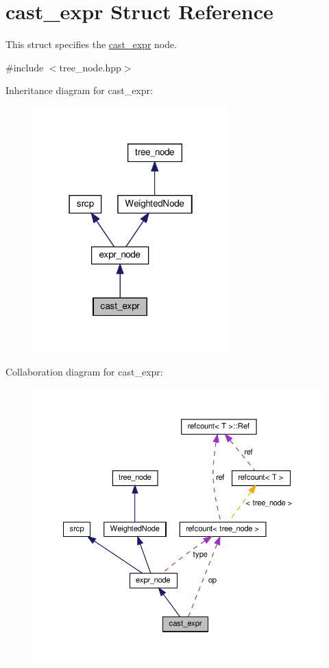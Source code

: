 \hypertarget{structcast__expr}{}\section{cast\+\_\+expr Struct Reference}
\label{structcast__expr}


This struct specifies the \hyperlink{structcast__expr}{cast\+\_\+expr} node.  




{\ttfamily \#include $<$tree\+\_\+node.\+hpp$>$}



Inheritance diagram for cast\+\_\+expr\+:
\nopagebreak
\begin{figure}[H]
\begin{center}
\leavevmode
\includegraphics[width=214pt]{d9/dc3/structcast__expr__inherit__graph}
\end{center}
\end{figure}


Collaboration diagram for cast\+\_\+expr\+:
\nopagebreak
\begin{figure}[H]
\begin{center}
\leavevmode
\includegraphics[width=350pt]{dc/dc0/structcast__expr__coll__graph}
\end{center}
\end{figure}
